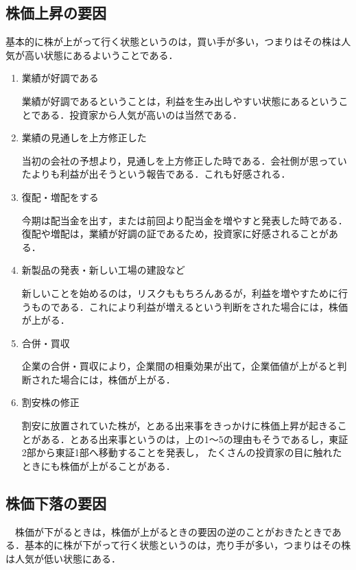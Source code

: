 \subsection{株価上昇の要因}
基本的に株が上がって行く状態というのは，買い手が多い，つまりはその株は人気が高い状態にあるよいうことである．
\begin{enumerate}
  \item 業績が好調である

業績が好調であるということは，利益を生み出しやすい状態にあるということである．投資家から人気が高いのは当然である．
  \item 業績の見通しを上方修正した

当初の会社の予想より，見通しを上方修正した時である．会社側が思っていたよりも利益が出そうという報告である．これも好感される．
 \item 復配・増配をする

今期は配当金を出す，または前回より配当金を増やすと発表した時である．復配や増配は，業績が好調の証であるため，投資家に好感されることがある．
  \item 新製品の発表・新しい工場の建設など

新しいことを始めるのは，リスクももちろんあるが，利益を増やすために行うものである．これにより利益が増えるという判断をされた場合には，株価が上がる．
  \item 合併・買収

企業の合併・買収により，企業間の相乗効果が出て，企業価値が上がると判断された場合には，株価が上がる．
  \item 割安株の修正

割安に放置されていた株が，とある出来事をきっかけに株価上昇が起きることがある．とある出来事というのは，上の1～5の理由もそうであるし，東証2部から東証1部へ移動することを発表し，
たくさんの投資家の目に触れたときにも株価が上がることがある\cite{kabuup}．
\end{enumerate}

\subsection{株価下落の要因}
　株価が下がるときは，株価が上がるときの要因の逆のことがおきたときである．基本的に株が下がって行く状態というのは，売り手が多い，つまりはその株は人気が低い状態にある．

